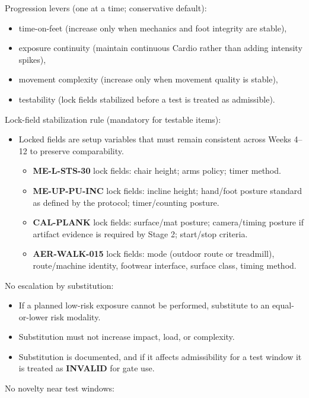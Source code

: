 \documentclass[10pt]{article}
\begin{document}
Progression levers (one at a time; conservative default):

\begin{itemize}
\item time-on-feet (increase only when mechanics and foot integrity are stable),
\item exposure continuity (maintain continuous Cardio rather than adding intensity spikes),
\item movement complexity (increase only when movement quality is stable),
\item testability (lock fields stabilized before a test is treated as admissible).
\end{itemize}

Lock-field stabilization rule (mandatory for testable items):

\begin{itemize}
\item Locked fields are setup variables that must remain consistent across Weeks 4–12 to preserve comparability.
  \begin{itemize}
  \item \textbf{ME-L-STS-30} lock fields: chair height; arms policy; timer method.
  \item \textbf{ME-UP-PU-INC} lock fields: incline height; hand/foot posture standard as defined by the protocol; timer/counting posture.
  \item \textbf{CAL-PLANK} lock fields: surface/mat posture; camera/timing posture if artifact evidence is required by Stage 2; start/stop criteria.
  \item \textbf{AER-WALK-015} lock fields: mode (outdoor route or treadmill), route/machine identity, footwear interface, surface class, timing method.
  \end{itemize}
\end{itemize}

No escalation by substitution:

\begin{itemize}
\item If a planned low-risk exposure cannot be performed, substitute to an equal-or-lower risk modality.
\item Substitution must not increase impact, load, or complexity.
\item Substitution is documented, and if it affects admissibility for a test window it is treated as \textbf{INVALID} for gate use.
\end{itemize}

No novelty near test windows:
\end{document}
